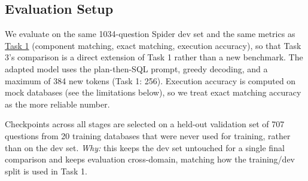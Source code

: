 \begin{table}[H]
\centering
\footnotesize
\caption{Training settings for each stage in table~\ref{tab:rq3-validation-accuracy-06b}. Learning rate is the peak LR under a linear schedule.}
\label{tab:rq3-training-settings}
\end{table}

\subsection{Evaluation Setup}
\label{sec:rq3-evaluation}

We evaluate on the same 1034-question Spider dev set and the same metrics as \hyperref[sec:rq1-results]{Task 1} (component matching, exact matching, execution accuracy), so that Task 3's comparison is a direct extension of Task 1 rather than a new benchmark. The adapted model uses the plan-then-SQL prompt, greedy decoding, and a maximum of 384 new tokens (Task 1: 256). Execution accuracy is computed on mock databases (see the limitations below), so we treat exact matching accuracy as the more reliable number.

Checkpoints across all stages are selected on a held-out validation set of 707 questions from 20 training databases that were never used for training, rather than on the dev set. \emph{Why:} this keeps the dev set untouched for a single final comparison and keeps evaluation cross-domain, matching how the training/dev split is used in Task 1.

